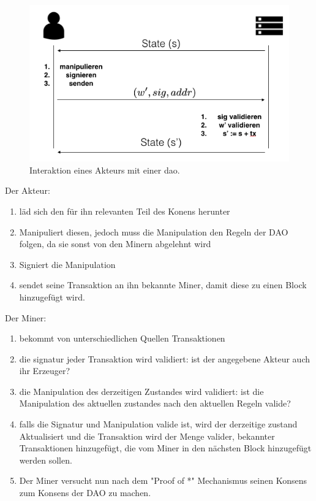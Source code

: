 \documentclass[a4paper,12pt]{report}
\begin{document}
\begin{figure}[ht]
    \centering
    \includegraphics[width=1\textwidth]{bilder/interaktion.png}
    \caption{Interaktion eines Akteurs mit einer dao.}
\end{figure}

Der Akteur:
\begin{enumerate}
  \item läd sich den für ihn relevanten Teil des Konens herunter
  \item Manipuliert diesen, jedoch muss die Manipulation den Regeln der DAO folgen, da sie sonst von den Minern abgelehnt wird
  \item Signiert die Manipulation
  \item sendet seine Transaktion an ihn bekannte Miner, damit diese zu einen Block hinzugefügt wird.
\end{enumerate}

Der Miner:
\begin{enumerate}
  \item bekommt von unterschiedlichen Quellen Transaktionen
  \item die signatur jeder Transaktion wird validiert: ist der angegebene Akteur auch ihr Erzeuger?
  \item die Manipulation des derzeitigen Zustandes wird validiert: ist die Manipulation des aktuellen zustandes nach den aktuellen Regeln valide?
  \item falls die Signatur und Manipulation valide ist, wird der derzeitige zustand Aktualisiert und die Transaktion wird der Menge valider, bekannter Transaktionen hinzugefügt, die vom Miner in den nächsten Block hinzugefügt werden sollen.
  \item Der Miner versucht nun nach dem "Proof of *" Mechanismus seinen Konsens zum Konsens der DAO zu machen.
\end{enumerate}
\end{document}
